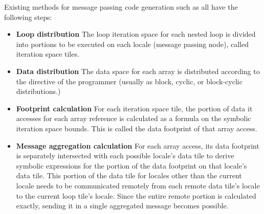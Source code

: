 \begin{comment}
Although a simple concept to understand, message aggregation is the most complicated part of message passing code generation. Existing methods \cite{goumas2006message, xue1997communication} split the loop iteration space into tiles (also known as footprints) of consecutive iterations, and each locale executes its tile's iterations in parallel. Communication using aggregation takes place between locales just before and after the computation within a single tile. These methods require the compiler to do complex footprint calculations, optimizing for tile size and shape, before message aggregation can take place. As \cite{ramanujam1992tiling} shows, determining tile shape quickly becomes difficult for more complicated loop structures, since the optimum tile shape for a computation is not always rectangular. It is our belief that message aggregation using tiling is not used in production quality compilers today because of the complexity of message aggregation calculations, described above. What is needed is a simple, robust, and widely applicable method for message aggregation that leads to improvements in performance. 
\end{comment}

Existing methods for message passing code generation such as \cite{Gupta91automaticdata, xue1997communication} all have the following steps:

\begin{itemize}

\item {\bf Loop distribution} The loop iteration space for each nested loop is divided into portions to be executed on each locale (message passing node), called iteration space tiles. 

\item {\bf Data distribution} The data space for each array is distributed according to the directive of the programmer (usually as block, cyclic, or block-cyclic distributions.)

\item {\bf Footprint calculation} For each iteration space tile, the portion of data it accesses for each array reference is calculated as a formula on the symbolic iteration space bounds. This is called the data footprint of that array access.

\item {\bf Message aggregation calculation} For each array access, its data footprint is separately intersected with each possible locale's data tile to derive symbolic expressions for the portion of the data footprint on that locale's data tile. This portion of the data tile for locales other than the current locale needs to be communicated remotely from each remote data tile's locale to the current loop tile's locale. Since the entire remote portion is calculated exactly, sending it in a single aggregated message becomes possible.

\end{itemize}

